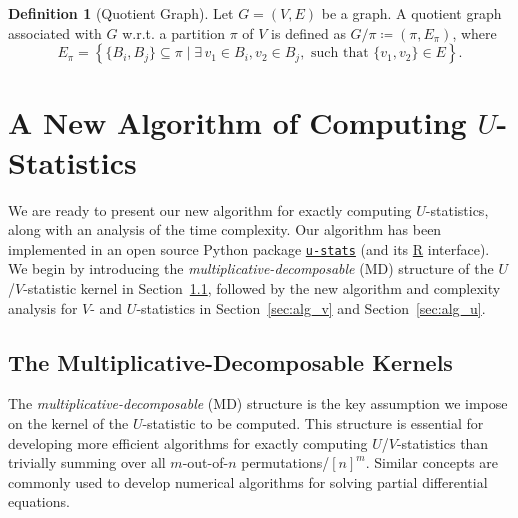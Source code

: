 \documentclass[12pt]{article}
\newcommand{\pdfu}{\texorpdfstring{$U$}{U}}
\newcommand{\libref}[2]{\href{#2}{\texttt{#1}}}
\def\package{\libref{u-stats}{https://github.com/zrq1706/U-Statistics-Python}}
\theoremstyle{plain}
\theoremstyle{definition}
\newtheorem{definition}{Definition}
\newcommand{\sPi}{\pi}
\def\package{\libref{u-stats}{https://github.com/zrq1706/U-Statistics-Python}}
\begin{document}
\begin{bibunit}[agsm]
\begin{definition}[Quotient Graph]
\label{def:quotient_graph}
Let $G = (V, E)$ be a graph. A quotient graph associated with $G$ w.r.t. a partition $\sPi$ of $V$ is defined as $G/\pi \coloneqq (\pi, E_{\pi})$, where
\begin{equation*}
    E_\pi = \left\{\{B_i,B_j\} \subseteq \pi \mid \exists \, v_1 \in B_i, v_2 \in B_j, \text{ such that } \{v_1, v_2\} \in E\right\}. 
\end{equation*}
\end{definition}


\section{A New Algorithm of Computing \pdfu{}-Statistics}
\label{sec:alg_u_v}

We are ready to present our new algorithm for exactly computing $U$-statistics, along with an analysis of the time complexity. Our algorithm has been implemented in an open source Python package \package{} (and its \href{https://github.com/cxy0714/U-Statistics-R}{R} interface). We begin by introducing the \emph{multiplicative-decomposable} (MD) structure of the $U$/$V$-statistic kernel in Section~\ref{sec:decomposition}, followed by the new algorithm and complexity analysis for $V$- and $U$-statistics in Section~\ref{sec:alg_v} and Section~\ref{sec:alg_u}.


\subsection{The Multiplicative-Decomposable Kernels}
\label{sec:decomposition}

The \emph{multiplicative-decomposable} (MD) structure is the key assumption we impose on the kernel of the $U$-statistic to be computed. This structure is essential for developing more efficient algorithms for exactly computing $U$/$V$-statistics than trivially summing over all $m$-out-of-$n$ permutations/$[n]^{m}$. Similar concepts are commonly used to develop numerical algorithms for solving partial differential equations.


\end{bibunit}
\end{document}
